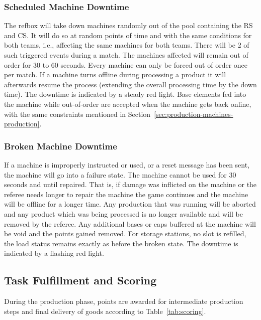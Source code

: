 \documentclass[12pt,twoside]{article}
\newcommand{\refsec}[1]{Section~\ref{#1}}
\newcommand{\reftab}[1]{Table~\ref{#1}}
\begin{document}
\subsubsection{Scheduled Machine Downtime}
\label{sec:out-of-order}
The refbox will take down machines randomly out of the pool containing
the RS and CS\@. It will do so at random points of time and with the
same conditions for both teams, i.e., affecting the same machines for
both teams. There will be 2 of such triggered events during a
match. The machines affected will remain out of order for 30 to 60
seconds. Every machine can only be forced out of order once per
match. If a machine turns offline during processing a product it will
afterwards resume the process (extending the overall processing time
by the down time). The downtime is indicated by a steady red
light. Base elements fed into the machine while out-of-order are
accepted when the machine gets back online, with the same constraints
mentioned in \refsec{sec:production-machines-production}.

\subsubsection{Broken Machine Downtime}
\label{sec:broken-machine}
If a machine is improperly instructed or used, or a reset message has
been sent, the machine will go into a failure state. The machine cannot be
used for 30 seconds and until repaired. That is, if damage was
inflicted on the machine or the referee needs longer to repair the
machine the game continues and the machine will be offline for a
longer time. Any production that was running will be aborted and any
product which was being processed is no longer available and will be
removed by the referee. Any additional bases or caps buffered at the machine
will be void and the points gained removed. For storage stations, no
slot is refilled, the load status remains exactly as before the broken
state. The downtime is indicated by a flashing red light.

\subsection{Task Fulfillment and Scoring}
\label{sec:production-scoring}
During the production phase, points are awarded for intermediate
production steps and final delivery of goods according to
\reftab{tab:scoring}.
\end{document}

